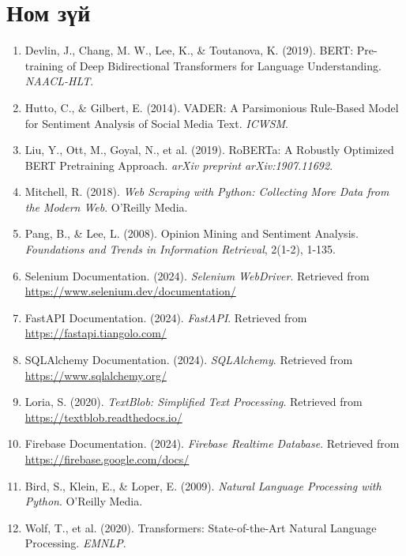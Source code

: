 \documentclass[12pt,a4paper]{report}
\begin{document}
\chapter*{Ном зүй}

\begin{enumerate}
    \item Devlin, J., Chang, M. W., Lee, K., \& Toutanova, K. (2019). BERT: Pre-training of Deep Bidirectional Transformers for Language Understanding. \textit{NAACL-HLT}.

    \item Hutto, C., \& Gilbert, E. (2014). VADER: A Parsimonious Rule-Based Model for Sentiment Analysis of Social Media Text. \textit{ICWSM}.

    \item Liu, Y., Ott, M., Goyal, N., et al. (2019). RoBERTa: A Robustly Optimized BERT Pretraining Approach. \textit{arXiv preprint arXiv:1907.11692}.

    \item Mitchell, R. (2018). \textit{Web Scraping with Python: Collecting More Data from the Modern Web}. O'Reilly Media.

    \item Pang, B., \& Lee, L. (2008). Opinion Mining and Sentiment Analysis. \textit{Foundations and Trends in Information Retrieval}, 2(1-2), 1-135.

    \item Selenium Documentation. (2024). \textit{Selenium WebDriver}. Retrieved from \url{https://www.selenium.dev/documentation/}

    \item FastAPI Documentation. (2024). \textit{FastAPI}. Retrieved from \url{https://fastapi.tiangolo.com/}

    \item SQLAlchemy Documentation. (2024). \textit{SQLAlchemy}. Retrieved from \url{https://www.sqlalchemy.org/}

    \item Loria, S. (2020). \textit{TextBlob: Simplified Text Processing}. Retrieved from \url{https://textblob.readthedocs.io/}

    \item Firebase Documentation. (2024). \textit{Firebase Realtime Database}. Retrieved from \url{https://firebase.google.com/docs/}

    \item Bird, S., Klein, E., \& Loper, E. (2009). \textit{Natural Language Processing with Python}. O'Reilly Media.

    \item Wolf, T., et al. (2020). Transformers: State-of-the-Art Natural Language Processing. \textit{EMNLP}.
\end{enumerate}
\end{document}
